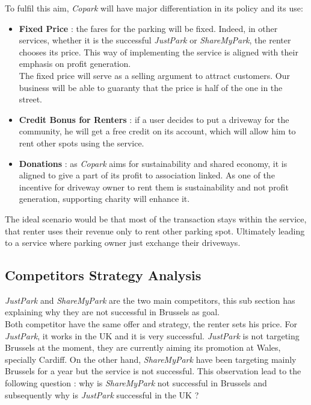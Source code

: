\documentclass[12pt,a4paper,oneside]{book}
\newcommand{\bp}{\textit{Copark }}
\begin{document}
To fulfil this aim, \bp will have major differentiation in its policy and its use:
\begin{itemize}
\item \textbf{Fixed Price} : the fares for the parking will be fixed. Indeed, in other services, whether it is  the successful \textit{JustPark} or \textit{ShareMyPark}, the renter chooses its price. This way of implementing the service is aligned with their emphasis on profit generation.\\
The fixed price will serve as a selling argument to attract customers. Our business will be able to guaranty that the price is half of the one in the street.
\item \textbf{Credit Bonus for Renters} : if a user decides to put a driveway for the community, he will get a free credit on its account, which will allow him to rent other spots using the service.
\item \textbf{Donations} : as \bp aims for sustainability and shared economy, it is aligned to give a part of its profit to association linked. As one of the incentive for driveway owner to rent them is sustainability and not profit generation, supporting charity will enhance it.
\end{itemize}

The ideal scenario would be that most of the transaction stays within the service, that renter uses their revenue only to rent other parking spot. Ultimately leading to a service where parking owner just exchange their driveways.

\subsection{Competitors Strategy Analysis}

\textit{JustPark} and \textit{ShareMyPark} are the two main competitors, this sub section has explaining why they are not successful in Brussels as goal.\\

Both competitor have the same offer and strategy, the renter sets his price. For \textit{JustPark}, it works in the UK and it is very successful. \textit{JustPark} is not targeting Brussels at the moment, they are currently aiming its promotion at Wales, specially Cardiff. On the other hand, \textit{ShareMyPark} have been targeting mainly Brussels for a year but the service is not successful. This observation lead to the following question : why is \textit{ShareMyPark} not successful in Brussels and subsequently why is \textit{JustPark} successful in the UK ?\\
\end{document}
